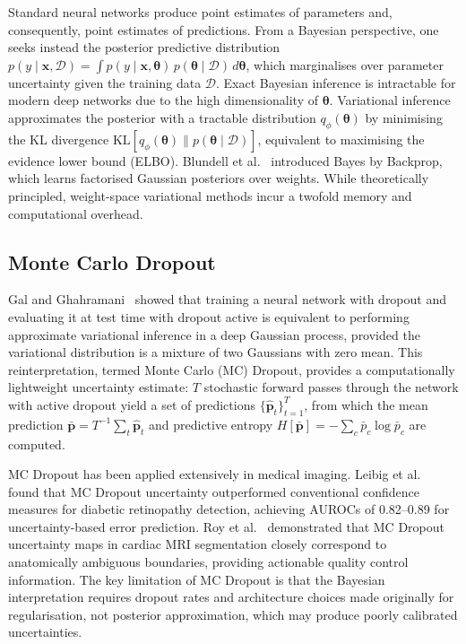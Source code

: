 Standard neural networks produce point estimates of parameters and, consequently, point estimates of predictions. From a Bayesian perspective, one seeks instead the posterior predictive distribution $p(y \mid \mathbf{x}, \mathcal{D}) = \int p(y \mid \mathbf{x}, \boldsymbol{\theta}) \, p(\boldsymbol{\theta} \mid \mathcal{D}) \, d\boldsymbol{\theta}$, which marginalises over parameter uncertainty given the training data $\mathcal{D}$. Exact Bayesian inference is intractable for modern deep networks due to the high dimensionality of $\boldsymbol{\theta}$. Variational inference approximates the posterior with a tractable distribution $q_\phi(\boldsymbol{\theta})$ by minimising the KL divergence $\text{KL}[q_\phi(\boldsymbol{\theta}) \| p(\boldsymbol{\theta} \mid \mathcal{D})]$, equivalent to maximising the evidence lower bound (ELBO). Blundell et al.~\cite{blundell2015weight} introduced Bayes by Backprop, which learns factorised Gaussian posteriors over weights. While theoretically principled, weight-space variational methods incur a twofold memory and computational overhead.

\subsection{Monte Carlo Dropout}

Gal and Ghahramani~\cite{gal2016dropout} showed that training a neural network with dropout and evaluating it at test time with dropout active is equivalent to performing approximate variational inference in a deep Gaussian process, provided the variational distribution is a mixture of two Gaussians with zero mean. This reinterpretation, termed Monte Carlo (MC) Dropout, provides a computationally lightweight uncertainty estimate: $T$ stochastic forward passes through the network with active dropout yield a set of predictions $\{\hat{\mathbf{p}}_t\}_{t=1}^T$, from which the mean prediction $\bar{\mathbf{p}} = T^{-1}\sum_t \hat{\mathbf{p}}_t$ and predictive entropy $H[\bar{\mathbf{p}}] = -\sum_c \bar{p}_c \log \bar{p}_c$ are computed.

MC Dropout has been applied extensively in medical imaging. Leibig et al.~\cite{leibig2017leveraging} found that MC Dropout uncertainty outperformed conventional confidence measures for diabetic retinopathy detection, achieving AUROCs of 0.82--0.89 for uncertainty-based error prediction. Roy et al.~\cite{roy2019bayesian} demonstrated that MC Dropout uncertainty maps in cardiac MRI segmentation closely correspond to anatomically ambiguous boundaries, providing actionable quality control information. The key limitation of MC Dropout is that the Bayesian interpretation requires dropout rates and architecture choices made originally for regularisation, not posterior approximation, which may produce poorly calibrated uncertainties.

